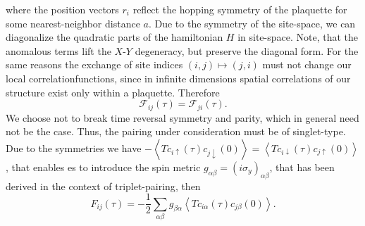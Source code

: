 \documentclass[aps,prb,twocolumn,groupedaddress,amsmath,amssymb]{revtex4-1}
\newcommand{\up}{\uparrow}
\newcommand{\dn}{\downarrow}
\newcommand{\refeq}[1]{Eq.~(\ref{#1})}
\newcommand{\expectv}[1]{\left< #1 \right>}
\newcommand{\nambu}[1]{\mathcal{#1}}
\newenvironment{rcases}{\left.\begin{aligned}}{\end{aligned}\right\rbrace}
\begin{document}
where the position vectors $r_i$ reflect the hopping symmetry of the plaquette for some nearest-neighbor distance $a$. Due to the symmetry of the site-space, we can diagonalize the quadratic parts of the hamiltonian $H$ in site-space. Note, that the anomalous terms lift the $X$-$Y$ degeneracy, but preserve the diagonal form. 
For the same reasons the exchange of site indices $(i,j)\mapsto(j,i)$ must not change our local correlationfunctions, since in infinite dimensions spatial correlations of our structure exist only within a plaquette. Therefore
\begin{equation}
  \label{eq:ijji}
  \nambu{F}_{ij}(\tau) = \nambu{F}_{ji}(\tau).
\end{equation}
We choose not to break time reversal symmetry and parity, which in general need not be the case.\cite{Balatsky1992} Thus, the pairing under consideration must be of singlet-type. Due to the symmetries we have $-\expectv{Tc_{i\up}(\tau)c_{j\dn}(0)}=\expectv{Tc_{i\dn}(\tau)c_{j\up}(0)}$, that enables es to introduce the spin metric $g_{\alpha\beta}=(i\sigma_y)_{\alpha\beta}$, that has been derived in the context of triplet-pairing\cite{Berezinskii1974}, then
\begin{equation}
  \label{eq:spinmetric}
  F_{ij}(\tau)=-\frac{1}{2}\sum_{\alpha\beta}g_{\beta\alpha}\expectv{Tc_{i\alpha}(\tau)c_{j\beta}(0)}.
\end{equation}
\end{document}
